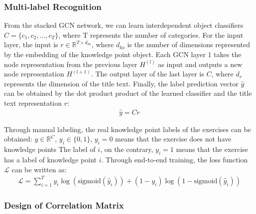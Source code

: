 \subsubsection{Multi-label Recognition}
From the stacked GCN network, we can learn interdependent object classifiers \(C=\{c_1,c_2,\ldots,c_T\} \), where T represents the number of categories. For the input layer, the input is \(r\in \mathbb{R}^{T \times d_{ko}}\), where \(d_{ko}\) is the number of dimensions represented by the embedding of the knowledge point object. Each GCN layer 1 takes the node representation from the previous layer \(H^{(l)}\) as input and outputs a new node representation \(H^{(l+1)}\). The output layer of the last layer is \(C\), where \(d_r\) represents the dimension of the title text. Finally, the label prediction vector \(\hat{y}\) can be obtained by the dot product product of the learned classifier and the title text representation \(r\):
\begin{align}
	\hat{y} = C r
\end{align}

Through manual labeling, the real knowledge point labels of the exercises can be obtained: \(y\in \mathbb{R}^C\), \(y_i\in \{0,1\} \), \(y_i=0\) means that the exercise does not have knowledge points The label of \(i\), on the contrary, \(y_i=1\) means that the exercise has a label of knowledge point \(i\). Through end-to-end training, the loss function \(\mathcal{L}\) can be written as:
\begin{align}
	\mathcal{L}=\sum_{i=1}^{T} y_i \log (\text{sigmoid}(\hat{y}_i))+(1-y_i) \log (1-\text{sigmoid}(\hat{y}_i))
\end{align}

\subsubsection{Design of Correlation Matrix}


